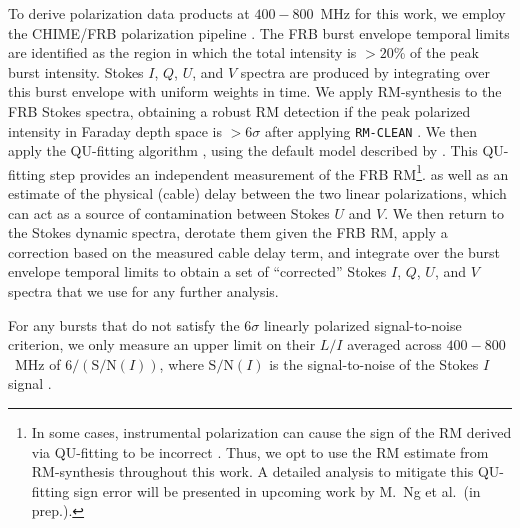 \documentclass[twocolumn, linenumbers]{aastex701}
\begin{document}
To derive polarization data products at $400-800$~MHz for this work, we employ the CHIME/FRB polarization pipeline \citep[for details, see][]{2021ApJ...920..138M, 2024ApJ...968...50P}. The FRB burst envelope temporal limits are identified as the region in which the total intensity is $>20$\% of the peak burst intensity. Stokes $I$, $Q$, $U$, and $V$ spectra are produced by integrating over this burst envelope with uniform weights in time. We apply RM-synthesis \citep{2005A&A...441.1217B} to the FRB Stokes spectra, obtaining a robust RM detection if the peak polarized intensity in Faraday depth space is $>6\sigma$ after applying {\tt RM-CLEAN} \citep{2009A&A...503..409H}. We then apply the QU-fitting algorithm \citep[implemented with a modified version of V1.2 of the {\tt RM-tools} package;][]{2020ascl.soft05003P, 2026arXiv260120092V}, using the default model described by \cite{2021ApJ...920..138M}. This QU-fitting step provides an independent measurement of the FRB RM\footnote{In some cases, instrumental polarization can cause the sign of the RM derived via QU-fitting to be incorrect \citep[see Appendix A by][]{2021ApJ...920..138M}. Thus, we opt to use the RM estimate from RM-synthesis throughout this work. A detailed analysis to mitigate this QU-fitting sign error will be presented in upcoming work by M.~Ng et al.~(in prep.).}. as well as an estimate of the physical (cable) delay between the two linear polarizations, which can act as a source of contamination between Stokes $U$ and $V$. We then return to the Stokes dynamic spectra, derotate them given the FRB RM, apply a correction based on the measured cable delay term, and integrate over the burst envelope temporal limits to obtain a set of ``corrected'' Stokes $I$, $Q$, $U$, and $V$ spectra that we use for any further analysis.

For any bursts that do not satisfy the $6\sigma$ linearly polarized signal-to-noise criterion, we only measure an upper limit on their $L/I$ averaged across $400-800$~MHz of $6/(\mathrm{S/N}(I))$, where $\mathrm{S/N}(I)$ is the signal-to-noise of the Stokes $I$ signal \citep{2024ApJ...968...50P}.
\end{document}
